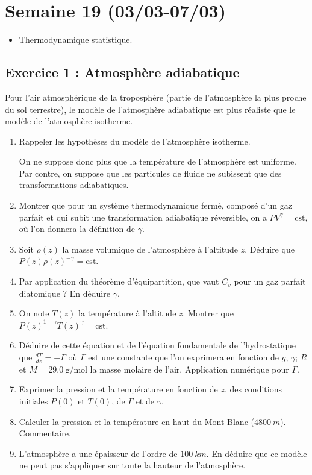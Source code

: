 \section{Semaine 19 (03/03-07/03) }

\begin{itemize}
	\item Thermodynamique statistique.
\end{itemize}

\subsection{Exercice 1 : Atmosphère adiabatique}

Pour l'air atmosphérique de la troposphère (partie de l'atmosphère la plus proche du sol terrestre), le modèle de l'atmosphère adiabatique est plus réaliste que le modèle de l'atmosphère isotherme.

\begin{enumerate}
	\item Rappeler les hypothèses du modèle de l'atmosphère isotherme.
	
	On ne suppose donc plus que la température de l'atmosphère est uniforme. Par contre, on suppose que les particules de fluide ne subissent que des transformations adiabatiques.
	
	\item Montrer que pour un système thermodynamique fermé, composé d'un gaz parfait et qui subit une transformation adiabatique réversible, on a $PV^\gamma = \textrm{cst}$, où l'on donnera la définition de $\gamma$. 
	
	\item Soit $\rho(z)$ la masse volumique de l'atmosphère à l'altitude $z$. Déduire que $P(z) \rho(z)^{-\gamma} = \textrm{cst}$.
	
	\item Par application du théorème d'équipartition, que vaut $C_v$ pour un gaz parfait diatomique ? En déduire $\gamma$.
	
	\item On note $T(z)$ la température à l'altitude $z$. Montrer que $P(z)^{1-\gamma} T(z)^\gamma = \textrm{cst}$.
	
	\item Déduire de cette équation et de l'équation fondamentale de l'hydrostatique que $\frac{dT}{dz} = -\Gamma$ où $\Gamma$ est une constante que l'on exprimera en fonction de $g$, $\gamma$; $R$ et $M = \SI{29.0}{\gram\per\mole}$ la masse molaire de l'air. Application numérique pour $\Gamma$.
	
	\item Exprimer la pression et la température en fonction de $z$, des conditions initiales $P(0)$ et $T(0)$, de $\Gamma$ et de $\gamma$.
	
	\item Calculer la pression et la température en haut du Mont-Blanc ($\SI{4800}{m}$). Commentaire.
	
	\item L'atmosphère a une épaisseur de l'ordre de $\SI{100}{km}$. En déduire que ce modèle ne peut pas s'appliquer sur toute la hauteur de l'atmosphère.
\end{enumerate}	


